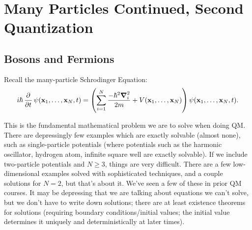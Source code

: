 \section{Many Particles Continued, Second Quantization}
\subsection{Bosons and Fermions}
Recall the many-particle Schrodinger Equation:
\begin{equation}
    i\hbar\dpd{}{t}\psi(\v{x}_1, \ldots, \v{x}_N, t) = \left(\sum_{i=1}^N \frac{-\hbar^2\nabla_i^2}{2m} + V(\v{x}_1, \ldots, \v{x}_N)\right)\psi(\v{x}_1, \ldots, \v{x}_N, t).
\end{equation}

This is the fundamental mathematical problem we are to solve when doing QM. There are depressingly few examples which are exactly solvable (almost none), such as single-particle potentials (where potentials such as the harmonic oscillator, hydrogen atom, infinite square well are exactly solvable). If we include two-particle potentials and $N \geq 3$, things are very difficult. There are a few low-dimensional examples solved with sophisticated techniques, and a couple solutions for $N = 2$, but that's about it. We've seen a few of these in prior QM courses. It may be depressing that we are talking about equations we can't solve, but we don't have to write down solutions; there are at least existence theorems for solutions (requiring boundary conditions/initial values; the initial value determines it uniquely and deterministically at later times). 

